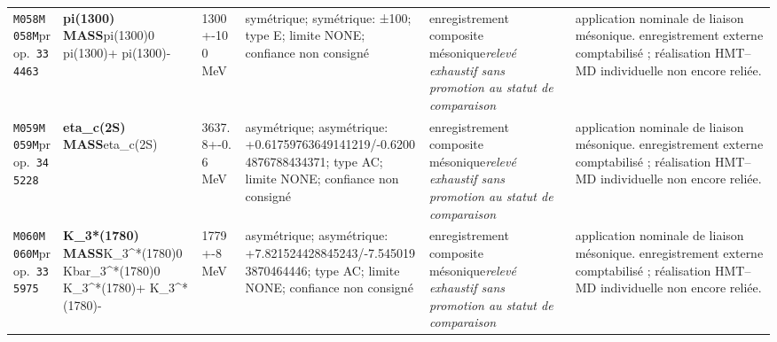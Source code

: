 \begin{landscape}
\begin{longtable}{L{1.85cm}L{4.45cm}L{2.35cm}L{4.05cm}L{3.35cm}L{7.15cm}}
\texttt{M058}\newline \texttt{M058M}\newline prop.\ \texttt{334463} & \textbf{pi(1300) MASS}\newline pi(1300)0 \textbar{}\allowbreak{} pi(1300)+ \textbar{}\allowbreak{} pi(1300)- & 1300+-100\,MeV & symétrique; symétrique: ±100; type E; limite NONE; confiance non consigné & enregistrement composite mésonique\newline \emph{relevé exhaustif sans promotion au statut de comparaison} & application nominale de liaison mésonique. enregistrement externe comptabilisé ; réalisation HMT--MD individuelle non encore reliée. \\
\texttt{M059}\newline \texttt{M059M}\newline prop.\ \texttt{345228} & \textbf{eta\_\allowbreak{}c(2S) MASS}\newline eta\_\allowbreak{}c(2S) & 3637.8+-0.6\,MeV & asymétrique; asymétrique: +0.61759763649141219/-0.62004876788434371; type AC; limite NONE; confiance non consigné & enregistrement composite mésonique\newline \emph{relevé exhaustif sans promotion au statut de comparaison} & application nominale de liaison mésonique. enregistrement externe comptabilisé ; réalisation HMT--MD individuelle non encore reliée. \\
\texttt{M060}\newline \texttt{M060M}\newline prop.\ \texttt{335975} & \textbf{K\_\allowbreak{}3*(1780) MASS}\newline K\_\allowbreak{}3\textasciicircum{}*(1780)0 \textbar{}\allowbreak{} Kbar\_\allowbreak{}3\textasciicircum{}*(1780)0 \textbar{}\allowbreak{} K\_\allowbreak{}3\textasciicircum{}*(1780)+ \textbar{}\allowbreak{} K\_\allowbreak{}3\textasciicircum{}*(1780)- & 1779+-8\,MeV & asymétrique; asymétrique: +7.821524428845243/-7.5450193870464446; type AC; limite NONE; confiance non consigné & enregistrement composite mésonique\newline \emph{relevé exhaustif sans promotion au statut de comparaison} & application nominale de liaison mésonique. enregistrement externe comptabilisé ; réalisation HMT--MD individuelle non encore reliée. \\

\end{longtable}
\end{landscape}
